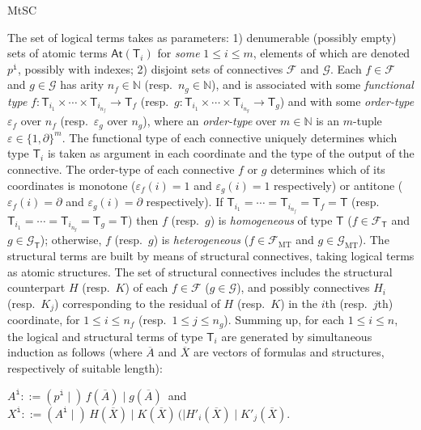 \begin{entry}{MtSC}
\begin{clarifications}
  The set  of logical terms takes as parameters: 1) denumerable (possibly empty)
  sets of atomic terms $\mathsf{At}(\mathsf{T}_i)$ for {\em some} $1\leq i\leq m$,
  elements of which are denoted $p^{\texttt{i}}$, possibly with indexes; 2)
  disjoint sets of connectives $\mathcal{F}$ and $\mathcal{G}$. Each $f\in
  \mathcal{F}$ and $g\in \mathcal{G}$ has arity $n_f\in \mathbb{N}$ (resp.\
  $n_g\in \mathbb{N}$), and is associated with some {\em functional type} $f:
  \mathsf{T}_{i_1}\times\cdots \times \mathsf{T}_{i_{n_f}}\to \mathsf{T}_{f}$
  (resp.~$g: \mathsf{T}_{i_1}\times\cdots \times \mathsf{T}_{i_{n_g}}\to
  \mathsf{T}_{g}$) and with some {\em order-type} $\varepsilon_f$ over $n_f$
  (resp.~$\varepsilon_g$ over $n_g$), where an {\em order-type} over $m\in
  \mathbb{N}$ is an $m$-tuple $\varepsilon\in \{1, \partial\}^m$.
  The functional type of each connective uniquely determines which type
  $\mathsf{T}_i$ is taken as argument in each coordinate  and the type of the
  output of the connective. The order-type   of each connective $f$ or $g$
  determines which of its coordinates is monotone ($\varepsilon_f(i) = 1$ and
  $\varepsilon_g(i) = 1$ respectively) or antitone ($\varepsilon_f(i) = \partial$
  and $\varepsilon_g(i) = \partial$ respectively). If $\mathsf{T}_{i_1} = \cdots
  =  \mathsf{T}_{i_{n_f}} =  \mathsf{T}_{f} = \mathsf{T}$ (resp.\
  $\mathsf{T}_{i_1} = \cdots  =  \mathsf{T}_{i_{n_g}} =  \mathsf{T}_{g} =
  \mathsf{T}$) then $f$ (resp.\ $g$) is {\em homogeneous} of type $\mathsf{T}$
  ($f\in \mathcal{F}_{\mathsf{T}}$ and $g\in \mathcal{G}_{\mathsf{T}}$);
  otherwise, $f$ (resp.\ $g$) is {\em heterogeneous} ($f\in
  \mathcal{F}_{\mathrm{MT}}$ and $g\in \mathcal{G}_{\mathrm{MT}}$). The structural
  terms are built by means of structural connectives, taking logical terms as
  atomic structures. The set of structural connectives includes the structural
  counterpart $H$ (resp.~$K$) of each $f\in \mathcal{F}$ ($g\in \mathcal{G}$), and
  possibly connectives $H_i$ (resp.~$K_j$) corresponding to the residual of $H$
  (resp.~$K$) in the $i$th (resp.~$j$th) coordinate, for $1\leq i\leq n_f$
  (resp.~$1\leq j\leq n_g$). Summing up, for each $1\leq i\leq n$, the logical and
  structural terms of type $\mathsf{T}_i$ are generated by simultaneous induction
  as follows (where $\overline{A}$ and $\overline{X}$ are vectors of formulas and
  structures, respectively of suitable length):
  
  \begin{center}
  $A^{\texttt{i}} ::= (p^{\texttt{i}} \mid)\, f(\overline{A}) \mid g(\overline{A})\,$ 
  \qquad 
  and 
  \qquad 
  $X^{\texttt{i}} ::= (A^{\texttt{i}} \mid)\, H(\overline{X}) \mid K(\overline{X}) \, (\mid H'_i(\overline{X}) \mid K'_j(\overline{X})$.
  \end{center}
  

\end{clarifications}
\end{entry}
